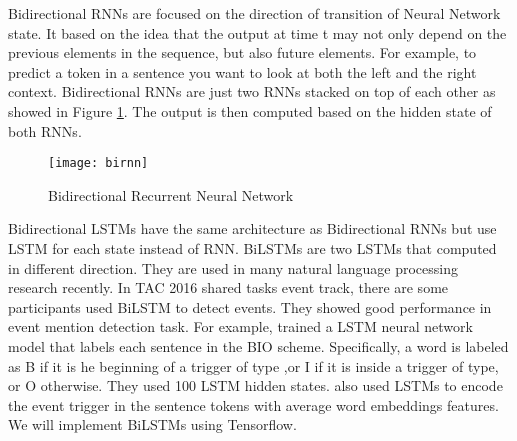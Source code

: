 \indent Bidirectional RNNs are focused on the direction of transition of Neural Network state. It based on the idea that the output at time t may not only depend on the previous elements in the sequence, but also future elements. For example, to predict a token in a sentence you want to look at both the left and the right context. Bidirectional RNNs are just two RNNs stacked on top of each other as showed in Figure \ref{fig:birnn}. The output is then computed based on the hidden state of both RNNs.\\
\begin{figure}
    \centering
    \texttt{[image: birnn]}
    \caption{Bidirectional Recurrent Neural Network}
    \label{fig:birnn}
\end{figure}
\indent Bidirectional LSTMs have the same architecture as Bidirectional RNNs but use LSTM for each state instead of RNN. BiLSTMs are two LSTMs that computed in different direction. They are used in many natural language processing research recently. In TAC 2016 shared tasks event track, there are some participants used BiLSTM to detect events. They showed good performance in event mention detection task. For example, \cite{zeng2016event}  trained a LSTM neural network model that labels each sentence in the BIO scheme. Speciﬁcally, a word is labeled as B if it is he beginning of a trigger of type ,or I if it is inside a trigger of type, or O otherwise.  They used 100 LSTM hidden states. \cite{mihaylov2016event} also used LSTMs to encode the event trigger in the sentence tokens with average word embeddings features. We will implement BiLSTMs using Tensorflow.